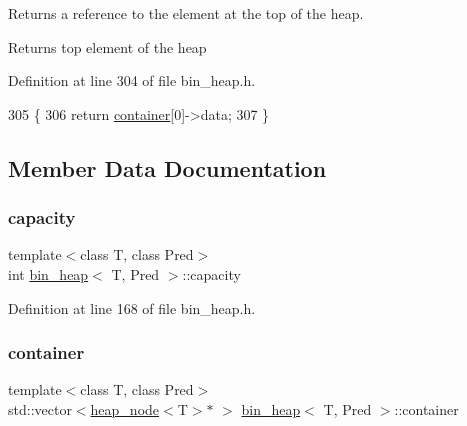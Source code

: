 Returns a reference to the element at the top of the heap. 

\begin{DoxyReturn}{Returns}
top element of the heap 
\end{DoxyReturn}


Definition at line 304 of file bin\+\_\+heap.\+h.


\begin{DoxyCode}
305 \{
306     \textcolor{keywordflow}{return} \mbox{\hyperlink{classbin__heap_a413200f4c6e24090c5e9a32184fc8857}{container}}[0]->data;
307 \}
\end{DoxyCode}


\subsection{Member Data Documentation}
\mbox{\label{classbin__heap_ac5aa6948898bfc047cae2fe99ba28f57}} 
\subsubsection{\texorpdfstring{capacity}{capacity}}
{\footnotesize\ttfamily template$<$class T, class Pred$>$ \\
int \mbox{\hyperlink{classbin__heap}{bin\+\_\+heap}}$<$ T, Pred $>$\+::capacity\hspace{0.3cm}{\ttfamily [private]}}



Definition at line 168 of file bin\+\_\+heap.\+h.

\mbox{\label{classbin__heap_a413200f4c6e24090c5e9a32184fc8857}} 
\subsubsection{\texorpdfstring{container}{container}}
{\footnotesize\ttfamily template$<$class T, class Pred$>$ \\
std\+::vector$<$\mbox{\hyperlink{classheap__node}{heap\+\_\+node}}$<$T$>$$\ast$ $>$ \mbox{\hyperlink{classbin__heap}{bin\+\_\+heap}}$<$ T, Pred $>$\+::container\hspace{0.3cm}{\ttfamily [private]}}



